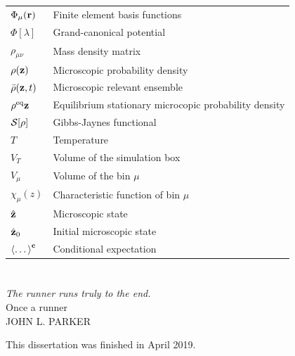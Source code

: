 \documentclass[b5paper,openright,10pt]{book}
\begin{document}
\begin{appendices}
\begin{tabular}{l l}
    $\Phi_{\mu}({\bf r})$ & Finite element basis functions \\
    $\Phi[\lambda]$ & Grand-canonical potential \\
    $\rho_{\mu\nu}$ & Mass density matrix \\
    $\rho({\bf z})$ & Microscopic probability density \\
    $\bar{\rho}({\bf z}, t)$ & Microscopic relevant ensemble \\
    $\rho^{\rm eq}{{\bf z}}$ & Equilibrium stationary microcopic probability density\\
    ${\cal S}[\rho]$ & Gibbs-Jaynes functional \\
    $T$ & Temperature \\
    $V_T$ & Volume of the simulation box \\
    $V_{\mu}$ & Volume of the bin $\mu$ \\
    $\chi_{\mu}(z)$ & Characteristic function of bin $\mu$ \\
    $\hat{{\bf z}}$  & Microscopic state \\
    $\hat{{\bf z}}_0$  & Initial microscopic state \\
    $\left<\dots\right>^{\bf c}$ & Conditional expectation \\
  \end{tabular}


\end{appendices}

\cleardoublepage
\pagestyle{Contents}
\listoffigures %

\cleardoublepage
{} %
\listoftables %

%
%

\newpage
\chapter*{} %
\pagestyle{noHeader}  %

\begin{center}
\textit{The runner runs truly to the end.} \\Once a runner \\ JOHN L. PARKER
\end{center}
\vspace{80pt}
\begin{center}
This dissertation was finished in April 2019. 
\end{center}
\end{document}

